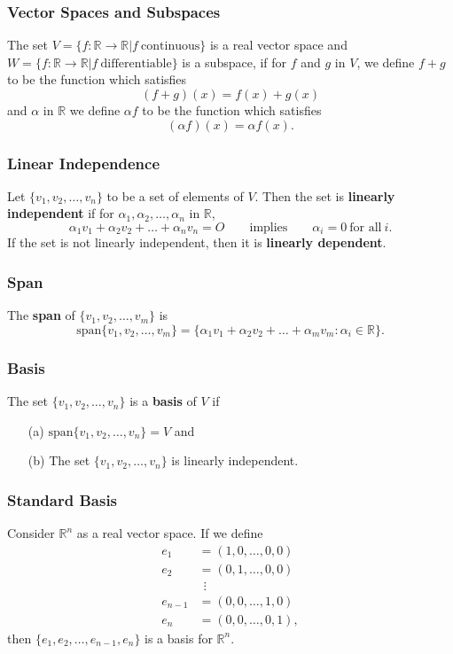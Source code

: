 \documentclass{beamer}
\begin{document}
\begin{frame}
\frametitle{Vector Spaces and Subspaces}
\begin{Example}
The set $V = \{f:\mathbb{R}\to\mathbb{R}| f\ \text{continuous}\}$ is a real vector space and $W = \{f:\mathbb{R}\to\mathbb{R}| f\ \text{differentiable}\}$ is a subspace, if for $f$ and $g$ in $V$, we define $f + g$ to be the function which satisfies 
$$
(f + g)(x) = f(x) + g(x)
$$
and $\alpha$ in $\mathbb{R}$ we define $\alpha f$ to be the function which satisfies 
$$
(\alpha f)(x) = \alpha f(x).
$$
\end{Example}
\end{frame}

\begin{frame}
\frametitle{Linear Independence}
\begin{Definition}
Let $\{v_1, v_2,\ldots, v_n\}$ to be a set of elements of $V$. Then the set is {\bf linearly independent} if for $\alpha_1, \alpha_2,\ldots, \alpha_n$ in $\mathbb{R}$, 
$$
\alpha_1 v_1 + \alpha_2 v_2+\ldots + \alpha_n v_n = O\qquad\text{implies}\qquad \alpha_i = 0\ \text{for all}\ i.
$$
If the set is not linearly independent, then it is {\bf linearly dependent}. 
\end{Definition}

\end{frame}

\begin{frame}
\frametitle{Span}
\begin{Definition}
The {\bf span} of $\{v_1, v_2,\ldots, v_m\}$ is 
$$
\text{span}\{v_1, v_2,\ldots, v_m\} = \{\alpha_1v_1 + \alpha_2 v_2 + \ldots + \alpha_m v_m : \alpha_i\in\mathbb{R}\}.
$$
\end{Definition}
\end{frame}

\begin{frame}
\frametitle{Basis}
\begin{Definition}
The set $\{v_1, v_2,\ldots, v_n\}$ is a {\bf basis} of $V$ if
\begin{enumerate}
\item[(a)] $\text{span}\{v_1, v_2,\ldots, v_n\} = V$ and
\item[(b)] The set $\{v_1, v_2,\ldots, v_n\}$ is linearly independent.
\end{enumerate}
\end{Definition}
\end{frame}

\begin{frame}
\frametitle{Standard Basis}
Consider $\mathbb{R}^n$ as a real vector space. If we define
\begin{align*}
e_1 	&= (1, 0, \ldots, 0, 0)\\
e_2 	&= (0, 1, \ldots, 0, 0)\\
	&\ \ \vdots\\
e_{n - 1} &= (0, 0, \ldots, 1, 0)\\
e_n &= (0, 0, \ldots, 0, 1),
\end{align*}
then $\{e_1, e_2, \ldots, e_{n - 1}, e_n\}$ is a basis for $\mathbb{R}^n$.
\end{frame}
\end{document}
